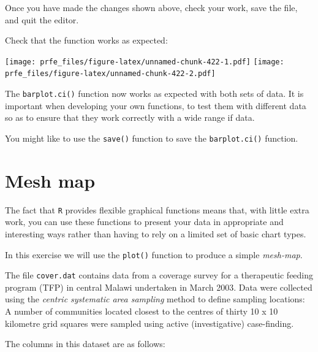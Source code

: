 \documentclass[12pt,a4paper]{book}
\newenvironment{Shaded}{\begin{snugshade}}{\end{snugshade}}
\newcommand{\KeywordTok}[1]{\textcolor[rgb]{0.13,0.29,0.53}{\textbf{#1}}}
\newcommand{\OperatorTok}[1]{\textcolor[rgb]{0.81,0.36,0.00}{\textbf{#1}}}
\newcommand{\NormalTok}[1]{#1}
\theoremstyle{definition}
\theoremstyle{definition}
\theoremstyle{definition}
\theoremstyle{remark}
\begin{document}
Once you have made the changes shown above, check your work, save the
file, and quit the editor.

Check that the function works as expected:

\begin{Shaded}
\end{Shaded}

\texttt{[image: prfe\_files/figure-latex/unnamed-chunk-422-1.pdf]}
\texttt{[image: prfe\_files/figure-latex/unnamed-chunk-422-2.pdf]}

The \texttt{barplot.ci()} function now works as expected with both sets
of data. It is important when developing your own functions, to test
them with different data so as to ensure that they work correctly with a
wide range if data.

You might like to use the \texttt{save()} function to save the
\texttt{barplot.ci()} function.

\hypertarget{mesh-map}{%
\section{Mesh map}\label{mesh-map}}

The fact that \texttt{R} provides flexible graphical functions means
that, with little extra work, you can use these functions to present
your data in appropriate and interesting ways rather than having to rely
on a limited set of basic chart types.

In this exercise we will use the \texttt{plot()} function to produce a
simple \emph{mesh-map}.

The file \texttt{cover.dat} contains data from a coverage survey for a
therapeutic feeding program (TFP) in central Malawi undertaken in March
2003. Data were collected using the \emph{centric systematic area
sampling} method to define sampling locations: A number of communities
located closest to the centres of thirty 10 x 10 kilometre grid squares
were sampled using active (investigative) case-finding.

The columns in this dataset are as follows:
\end{document}
